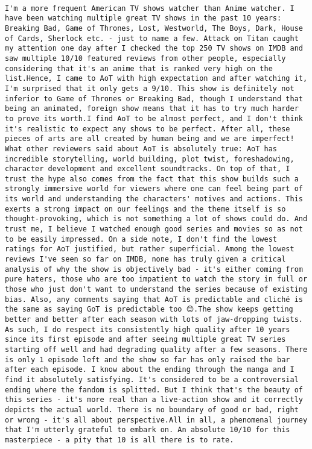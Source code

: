 \documentclass[
]{article}
\begin{document}
\begin{verbatim}
                                                                                                                                             I'm a more frequent American TV shows watcher than Anime watcher. I have been watching multiple great TV shows in the past 10 years: Breaking Bad, Game of Thrones, Lost, Westworld, The Boys, Dark, House of Cards, Sherlock etc. - just to name a few. Attack on Titan caught my attention one day after I checked the top 250 TV shows on IMDB and saw multiple 10/10 featured reviews from other people, especially considering that it's an anime that is ranked very high on the list.Hence, I came to AoT with high expectation and after watching it, I'm surprised that it only gets a 9/10. This show is definitely not inferior to Game of Thrones or Breaking Bad, though I understand that being an animated, foreign show means that it has to try much harder to prove its worth.I find AoT to be almost perfect, and I don't think it's realistic to expect any shows to be perfect. After all, these pieces of arts are all created by human being and we are imperfect! What other reviewers said about AoT is absolutely true: AoT has incredible storytelling, world building, plot twist, foreshadowing, character development and excellent soundtracks. On top of that, I trust the hype also comes from the fact that this show builds such a strongly immersive world for viewers where one can feel being part of its world and understanding the characters' motives and actions. This exerts a strong impact on our feelings and the theme itself is so thought-provoking, which is not something a lot of shows could do. And trust me, I believe I watched enough good series and movies so as not to be easily impressed. On a side note, I don't find the lowest ratings for AoT justified, but rather superficial. Among the lowest reviews I've seen so far on IMDB, none has truly given a critical analysis of why the show is objectively bad - it's either coming from pure haters, those who are too impatient to watch the story in full or those who just don't want to understand the series because of existing bias. Also, any comments saying that AoT is predictable and cliché is the same as saying GoT is predictable too 😊.The show keeps getting better and better after each season with lots of jaw-dropping twists. As such, I do respect its consistently high quality after 10 years since its first episode and after seeing multiple great TV series starting off well and had degrading quality after a few seasons. There is only 1 episode left and the show so far has only raised the bar after each episode. I know about the ending through the manga and I find it absolutely satisfying. It's considered to be a controversial ending where the fandom is splitted. But I think that's the beauty of this series - it's more real than a live-action show and it correctly depicts the actual world. There is no boundary of good or bad, right or wrong - it's all about perspective.All in all, a phenomenal journey that I'm utterly grateful to embark on. An absolute 10/10 for this masterpiece - a pity that 10 is all there is to rate.

\end{verbatim}
\end{document}
